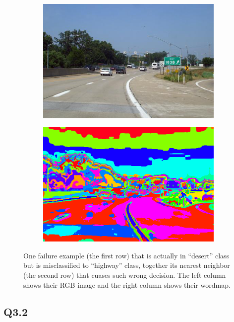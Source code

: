 \documentclass[11pt]{article}
\begin{document}
\begin{figure}[h!]
  \begin{subfigure}{0.45\linewidth}
    \centering
    \includegraphics[width=\textwidth]{../results/sun_bgbooicntiiexavj_image.png}
  \end{subfigure}
  \begin{subfigure}{0.45\linewidth}
    \centering
    \includegraphics[width=\textwidth]{../results/sun_bgbooicntiiexavj_wordmap.png}
  \end{subfigure}
  \caption{One failure example (the first row) that is actually in ``desert'' class but is misclassified to ``highway'' class, together its nearest neighbor (the second row) that cuases such wrong decision. The left column shows their RGB image and the right column shows their wordmap. }
  \label{fig:q2.6}
\end{figure}

\newpage

\subsection*{Q3.2}
\end{document}
